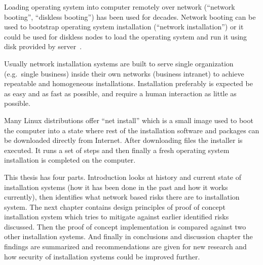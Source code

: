 
\iffalse
\begin{itemize}
\item FIXME: TODO REMOVE THIS LIST
\item INTRODUCTION: The Setting - bird eye's view - the challenge to be tackled / thing to be be improved in general
\item INTRODUCTION: Past research done
\item INTRODUCTION: Gap in knowledge/problem not yet solved
\item INTRODUCTION: Purpose and method of this work
\item INTRODUCTION: More detailed description what was done
\item INTRODUCTION: Results acquired
\item INTRODUCTION: Analysis and limitations of the result (Mostly relocate to Conclusions)
\item INTRODUCTION: Value (Mostly relocate to Conclusions)
\end{itemize}
\fi

Loading operating system into computer remotely over network
(``network booting'', ``diskless booting'') has been used for
decades. Network booting can be used to bootstrap operating system
installation (``network installation'') or it could be used for
diskless nodes to load the operating system and run it using disk
provided by server~\cite{anvin2008x86}.

Usually network installation systems are built to serve single
organization (e.g.\ single business) inside their own networks
(business intranet) to achieve repeatable and homogeneous
installations. Installation preferably is expected be as easy and as
fast as possible, and require a human interaction as little as
possible. %

Many Linux distributions offer ``net install'' which is a small image
used to boot the computer into a state where rest of the installation
software and packages can be downloaded directly from Internet. After
downloading files the installer is executed. It runs a set of steps
and then finally a fresh operating system installation is completed on
the computer.

This thesis has four parts. Introduction looks at history and current
state of installation systems (how it has been done in the past and
how it works currently), then identifies what network based risks
there are to installation system. The next chapter contains design
principles of proof of concept installation system which tries to
mitigate against earlier identified risks discussed. Then the proof of
concept implementation is compared against two other installation
systems. And finally in conclusions and discussion chapter the
findings are summarized and recommendations are given for new research
and how security of installation systems could be improved further.


